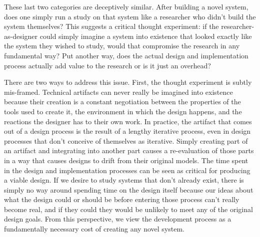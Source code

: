 These last two categories are deceptively similar. After building a novel system, does one simply run a study on that system like a researcher who didn't build the system themselves? This suggests a critical thought experiment: if the researcher-as-designer could simply imagine a system into existence that looked exactly like the system they wished to study, would that compromise the research in any fundamental way? Put another way, does the actual design and implementation process actually add value to the research or is it just an overhead?

There are two ways to address this issue. First, the thought experiment is subtly mis-framed. Technical artifacts can never really be imagined into existence because their creation is a constant negotiation between the properties of the tools used to create it, the environment in which the design happens, and the reactions the designer has to their own work. In practice, the artifact that comes out of a design process is the result of a lengthy iterative process, even in design processes that don't conceive of themselves as iterative. Simply creating part of an artifact and integrating into another part causes a re-evaluation of those parts in a way that causes designs to drift from their original models. The time spent in the design and implementation processes can be seen as critical for producing a viable design. If we desire to study systems that don't already exist, there is simply no way around spending time on the design itself because our ideas about what the design could or should be before entering those process can't really become real, and if they could they would be unlikely to meet any of the original design goals. From this perspective, we view the development process as a fundamentally necessary cost of creating any novel system. 


